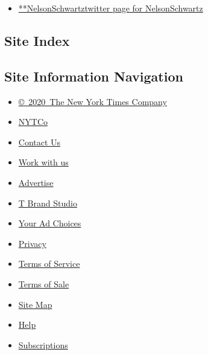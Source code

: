 \begin{itemize}
\tightlist
\item
  \href{https://twitter.com/NelsonSchwartz}{**NelsonSchwartztwitter page
  for NelsonSchwartz}
\end{itemize}

\hypertarget{site-index}{%
\subsection{Site Index}\label{site-index}}

\hypertarget{site-information-navigation}{%
\subsection{Site Information
Navigation}\label{site-information-navigation}}

\begin{itemize}
\tightlist
\item
  \href{https://help.nytimes3xbfgragh.onion/hc/en-us/articles/115014792127-Copyright-notice}{©~2020~The
  New York Times Company}
\end{itemize}

\begin{itemize}
\tightlist
\item
  \href{https://www.nytco.com/}{NYTCo}
\item
  \href{https://help.nytimes3xbfgragh.onion/hc/en-us/articles/115015385887-Contact-Us}{Contact
  Us}
\item
  \href{https://www.nytco.com/careers/}{Work with us}
\item
  \href{https://nytmediakit.com/}{Advertise}
\item
  \href{http://www.tbrandstudio.com/}{T Brand Studio}
\item
  \href{https://www.nytimes3xbfgragh.onion/privacy/cookie-policy\#how-do-i-manage-trackers}{Your
  Ad Choices}
\item
  \href{https://www.nytimes3xbfgragh.onion/privacy}{Privacy}
\item
  \href{https://help.nytimes3xbfgragh.onion/hc/en-us/articles/115014893428-Terms-of-service}{Terms
  of Service}
\item
  \href{https://help.nytimes3xbfgragh.onion/hc/en-us/articles/115014893968-Terms-of-sale}{Terms
  of Sale}
\item
  \href{https://spiderbites.nytimes3xbfgragh.onion}{Site Map}
\item
  \href{https://help.nytimes3xbfgragh.onion/hc/en-us}{Help}
\item
  \href{https://www.nytimes3xbfgragh.onion/subscription?campaignId=37WXW}{Subscriptions}
\end{itemize}
